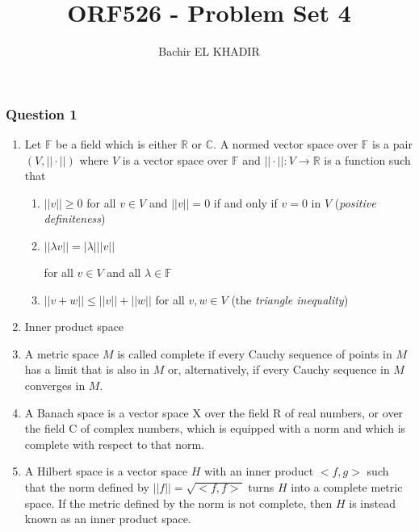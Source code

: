 \documentclass[12pt]{article}
\title{ORF526 - Problem Set 4}
\author{Bachir EL KHADIR }
\newcommand{\Q}[1]{\subsubsection*{Question #1}}
\newcommand{\norm}[1]{||{#1}|| }
\newcommand{\abs}[1]{|{#1}| }
\begin{document}
\maketitle

\Q{1}
\begin{enumerate}

\item
Let $\mathbb{F}$ be a field which is either $\mathbb{R}$ or $\mathbb{C}$.  A normed vector space over $\mathbb{F}$ is a pair $(V,\norm{\cdot})$ where $V$ is a vector space over $\mathbb{F}$ and $\norm{\cdot}\colon V\to\mathbb{R}$ is a function such that
\begin{enumerate}
\item $\norm{v}\geq 0$ for all $v\in V$ and $\norm{v}=0$ if and only if $v=0$ in $V$ (\emph{positive definiteness})
\item $\norm{\lambda v} = \abs{\lambda} \norm{v}$ 

for all $v\in V$ and all $\lambda\in\mathbb{F}$
\item $\norm{v+w}\leq\norm{v}+\norm{w}$ for all $v,w\in V$ (the \emph{triangle inequality})
\end{enumerate}


\item Inner product space

\item A metric space $M$ is called complete if every Cauchy sequence of points in $M$ has a limit that is also in $M$ or, alternatively, if every Cauchy sequence in $M$ converges in $M$.

\item A Banach space is a vector space X over the field R of real numbers, or over the field C of complex numbers, which is equipped with a norm and which is complete with respect to that norm.

\item A Hilbert space is a vector space $H$ with an inner product $<f,g>$ such that the norm defined by
 $\norm{f}=\sqrt{<f,f>}$
turns $H$ into a complete metric space. If the metric defined by the norm is not complete, then $H$ is instead known as an inner product space.
\end{enumerate}
\end{document}

